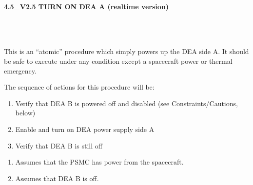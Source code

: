 \documentclass[11pt]{article}
\begin{document}
%
%
%
\newcommand{\be}{\begin{enumerate}}
\newcommand{\ee}{\end{enumerate}}
\newcommand{\bc}{\begin{center}}
\newcommand{\ec}{\end{center}}
\newcommand{\bi}{\begin{itemize}}
\newcommand{\ei}{\end{itemize}}
\newcommand{\bd}{\begin{description}}
\newcommand{\ed}{\end{description}}
\newcommand{\bt}{\begin{tabbing}}
\newcommand{\et}{\end{tabbing}}
\newcommand{\eg}{{\it e.g.~}}
\newcommand{\ie}{{\it i.e.~}}
\newcommand{\ul}{\underline}
\newcommand{\axaf}{{\em AXAF}}

\def\la{\hbox{\rlap{$<$}\lower0.5ex\hbox{$\sim$}\ }}


\large
\centerline {\bf 4.5\_V2.5 TURN ON DEA A (realtime version) }
\vspace{0.25in}

\normalsize
{}\\
 \\


 \\
\normalsize
This is an ``atomic'' procedure which simply powers up the DEA side A.
It should be safe to execute under any
condition except a spacecraft power or thermal emergency.

\vspace{0.25in}
\noindent The sequence of actions for this procedure will be:
\be
\item Verify that DEA B is powered off and disabled (see Constraints/Cautions, below)
\vspace{-0.10in}
\item Enable and turn on DEA power supply side A
\vspace{-0.10in}
\item Verify that DEA B is still off
\ee

\vspace{0.15in}
\normalsize
{}
\normalsize
\be
\item Assumes that the PSMC has power from the spacecraft.
\vspace{-0.10in}
\item Assumes that DEA B is off.
\ee
\vspace{0.1in}
\normalsize
{} \\
\normalsize
\end{document}
